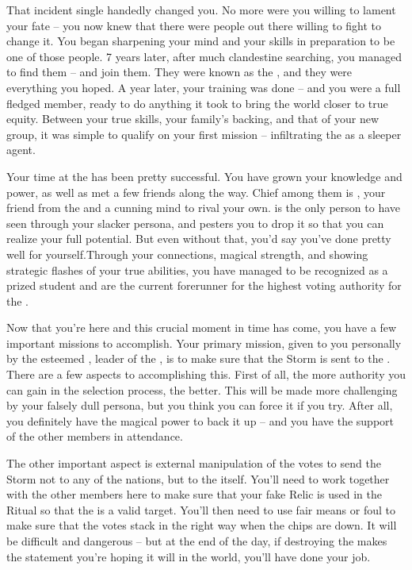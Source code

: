 \documentclass[char]{GL2020}
\begin{document}
That incident single handedly changed you. No more were you willing to lament your fate -- you now knew that there were people out there willing to fight to change it. You began sharpening your mind and your skills in preparation to be one of those people. 7 years later, after much clandestine searching, you managed to find them -- and join them. They were known as the \pGoaties{}, and they were everything you hoped. A year later, your training was done -- and you were a full fledged member, ready to do anything it took to bring the world closer to true equity. Between your true skills, your family’s backing, and that of your new group, it was simple to qualify on your first mission -- infiltrating the \pSchool{} as a sleeper agent.
 
Your time at the \pSc{} has been pretty successful. You have grown your knowledge and power, as well as met a few friends along the way. Chief among them is \cAmbition{}, your friend from the \pTech{} and a cunning mind to rival your own. \cAmbition{} is the only person to have seen through your slacker persona, and pesters you to drop it so that you can realize your full potential. But even without that, you’d say you’ve done pretty well for yourself.Through your connections, magical strength, and showing strategic flashes of your true abilities, you have managed to be recognized as a prized student and are the current forerunner for the highest voting authority for the \pFarm{}.
 
Now that you’re here and this crucial moment in time has come, you have a few important missions to accomplish. Your primary mission, given to you personally by the esteemed \cChupLeader{}, leader of the \pGoaties{}, is to make sure that the Storm is sent to the \pSc{}. There are a few aspects to accomplishing this. First of all, the more authority you can gain in the selection process, the better. This will be made more challenging by your falsely dull persona, but you think you can force it if you try. After all, you definitely have the magical power to back it up -- and you have the support of the other members in attendance. 
 
The other important aspect is external manipulation of the votes to send the Storm not to any of the nations, but to the \pSc{} itself. You’ll need to work together with the other members here to make sure that your fake Relic is used in the Ritual so that the \pSc{} is a valid target. You’ll then need to use fair means or foul to make sure that the votes stack in the right way when the chips are down. It will be difficult and dangerous -- but at the end of the day, if destroying the \pSc{} makes the statement you’re hoping it will in the world, you’ll have done your job.
 
\end{document}
